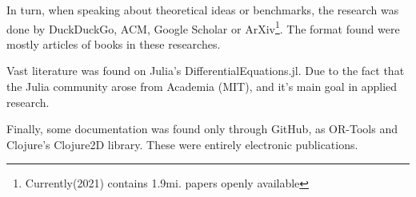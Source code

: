\documentclass[
12pt,				%
openright,			%
oneside,			%
a4paper,			%
brazil,				%
english,			%
]{abntex2}
\begin{document}
In turn, when speaking about theoretical ideas or
benchmarks, the research was done by DuckDuckGo, ACM, Google
Scholar or ArXiv\footnote{Currently(2021) contains 1.9mi. papers
  openly available}. The format found were mostly articles of books in
these researches.

Vast literature was found on Julia's
DifferentialEquations.jl. Due to the fact that the Julia community
arose from Academia (MIT), and it's main goal in applied research.

Finally, some documentation was found only through GitHub, as OR-Tools
and Clojure's Clojure2D library. These were entirely electronic publications.




\end{document}
